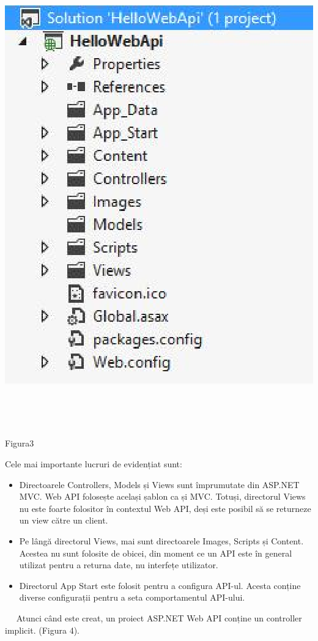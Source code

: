 \begin{center}
\includegraphics[width=15cm,height=20cm]{imagini/asp.eps} 
\caption{Figura3}
\end{center}

Cele mai importante lucruri de evidențiat sunt:
\begin{itemize}
	\item Directoarele Controllers, Models și Views sunt împrumutate din ASP.NET MVC. Web API folosește același șablon ca și MVC. Totuși, directorul Views nu este foarte folositor în contextul Web API, deși este posibil să se returneze un view către un client.
	\item Pe lângă directorul Views, mai sunt directoarele Images, Scripts și Content. Acestea nu sunt folosite de obicei, din moment ce un API este în general utilizat pentru a returna date, nu interfețe utilizator.
	\item Directorul App Start este folosit pentru a configura API-ul. Acesta conține diverse configurații pentru a seta comportamentul API-ului. 
\end{itemize}
 
Atunci când este creat, un proiect ASP.NET Web API conține un controller implicit. (Figura 4).

